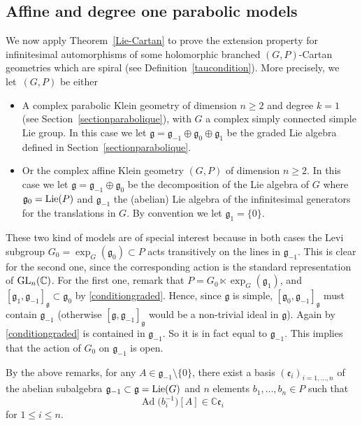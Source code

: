 \documentclass[pdftex]{sigma}
\numberwithin{equation}{section}
\begin{document}
\subsection{Affine and degree one parabolic models}
We now apply Theorem~\ref{Lie-Cartan} to prove the extension property for infinitesimal automorphisms of some holomorphic branched $(G,P)$-Cartan geometries which are spiral (see Definition~\ref{taucondition}). More precisely, we let~$(G,P)$ be either
\begin{itemize}\itemsep=0pt
 \item[$\bullet$] A complex parabolic Klein geometry of dimension $n\geq 2$ and degree $k=1$ (see Section~\ref{sectionparabolique}), with $G$ a complex simply connected simple Lie group. In this case we let $\mathfrak{g}=\mathfrak{g}_{-1}\oplus \mathfrak{g}_0\oplus \mathfrak{g}_1$ be the graded Lie algebra defined in Section~\ref{sectionparabolique}.
\item[$\bullet$] Or the complex affine Klein geometry $(G,P)$ of dimension $n\geq 2$. In this case we let $\mathfrak{g}=\mathfrak{g}_{-1}\oplus \mathfrak{g}_0$ be the decomposition of the Lie algebra of $G$ where $\mathfrak{g}_0={\rm Lie}(P)$ and $\mathfrak{g}_{-1}$ the (abelian) Lie algebra of the infinitesimal generators for the translations in $G$. By convention we let $\mathfrak{g}_{1}=\{0\}$. \end{itemize}

These two kind of models are of special interest because in both cases the Levi subgroup $G_0=\exp _{G}(\mathfrak{g}_0)\subset P$ acts transitively on the lines in $\mathfrak{g}_{-1}$. This is clear for the second one, since the corresponding action is the standard representation of ${\rm GL}_n(\mathbb{C})$. For the first one, remark that $P=G_0 \ltimes \exp _G(\mathfrak{g}_1)$, and $[\mathfrak{g}_1,\mathfrak{g}_{-1}]_\mathfrak{g} \subset \mathfrak{g}_0$ by \eqref{conditiongraded}. Hence, since $\mathfrak{g}$ is simple, $[\mathfrak{g}_0,\mathfrak{g}_{-1}]_\mathfrak{g}$ must contain $\mathfrak{g}_{-1}$ (otherwise $[\mathfrak{g},\mathfrak{g}_{-1}]_{\mathfrak{g}}$ would be a non-trivial ideal in $\mathfrak{g}$). Again by \eqref{conditiongraded} is contained in $\mathfrak{g}_{-1}$. So it is in fact equal to $\mathfrak{g}_{-1}$. This implies that the action of $G_0$ on $\mathfrak{g}_{-1}$ is open.


By the above remarks, for any $A\in \mathfrak{g}_{-1}\setminus \{0\}$, there exist a basis $(\mathfrak{e}_i)_{i=1,\dots,n}$ of the abelian subalgebra $\mathfrak{g}_{-1}\subset \mathfrak{g}={\rm Lie}(G)$ and $n$ elements $b_1,\dots,b_n \in P$ such that{\samepage \begin{equation}\label{pi} \operatorname{Ad}\big(b_i^{-1}\big)[A]\in \mathbb{C} \mathfrak{e}_i \end{equation} for $1\leq i\leq n$.}
\end{document}
